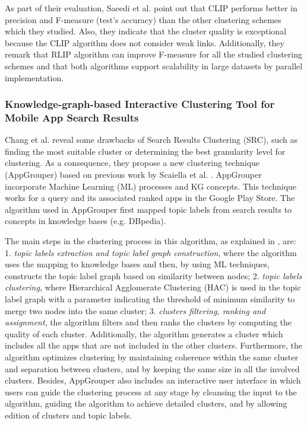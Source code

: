 \documentclass[runningheads]{llncs}
\begin{document}
As part of their evaluation, Saeedi et al. \cite{Saeedi} point out that CLIP performs better in precision and F-measure (test's accuracy) than the other clustering schemes which they studied. Also, they indicate that the cluster quality is exceptional because the CLIP algorithm does not  consider weak links. Additionally, they remark that RLIP algorithm can improve F-measure for all the studied clustering schemes and that both algorithms support scalability in large datasets by parallel implementation.

\subsubsection{Knowledge-graph-based Interactive Clustering Tool for Mobile App Search Results} \label{app}

Chang et al. \cite{Chang} reveal some drawbacks of Search Results Clustering (SRC), such as finding the most suitable cluster or determining the best granularity level for clustering. As a consequence, they propose a new clustering technique (AppGrouper) based on previous work by Scaiella et al. \cite{Scaiella}. AppGrouper incorporate Machine Learning (ML) processes and KG concepts. This technique works for a query and its associated ranked apps in the Google Play Store. The algorithm used in AppGrouper first mapped topic labels from search results to concepts in knowledge bases (e.g. DBpedia).

The main steps in the clustering process in this algorithm, as explained in \cite{Chang}, are: 1. \textit{topic labels extraction and topic label graph construction}, where the algorithm uses the mapping to knowledge bases and then, by using ML techniques, constructs the topic label graph based on similarity between nodes; 2. \textit{topic labels clustering}, where Hierarchical Agglomerate Clustering (HAC) is used in the topic label graph with a parameter indicating the threshold of minimum similarity to merge two nodes into the same cluster; 3. \textit{clusters filtering, ranking and assignment}, the algorithm filters and then ranks the clusters by computing the quality of each cluster. Additionally, the algorithm generates a cluster which includes all the apps that are not included in the other clusters. Furthermore, the algorithm optimizes clustering by maintaining coherence within the same cluster and separation between clusters, and by keeping the same size in all the involved clusters. Besides, AppGrouper also includes an interactive user interface in which users can guide the clustering process at any stage by cleansing the input to the algorithm, guiding the algorithm to achieve detailed clusters, and by allowing edition of clusters and topic labels. 
\end{document}
